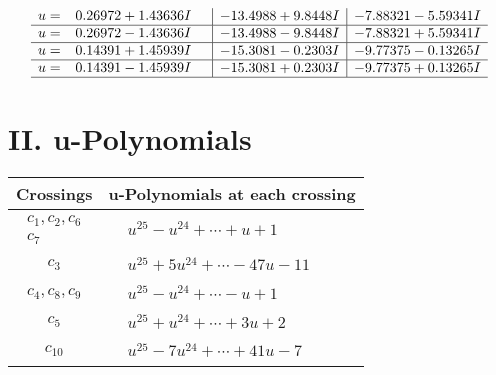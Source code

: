 \documentclass[1p]{elsarticle_modified}
\theoremstyle{definition}
\begin{document}
$$\begin{array}{c|c|c}
\begin{aligned}
u &= \phantom{-}0.26972 + 1.43636 I\end{aligned}
 & -13.4988 + 9.8448 I & -7.88321 - 5.59341 I \\ \hline\begin{aligned}
u &= \phantom{-}0.26972 - 1.43636 I\end{aligned}
 & -13.4988 - 9.8448 I & -7.88321 + 5.59341 I \\ \hline\begin{aligned}
u &= \phantom{-}0.14391 + 1.45939 I\end{aligned}
 & -15.3081 - 0.2303 I & -9.77375 - 0.13265 I \\ \hline\begin{aligned}
u &= \phantom{-}0.14391 - 1.45939 I\end{aligned}
 & -15.3081 + 0.2303 I & -9.77375 + 0.13265 I\\
 \hline 
 \end{array}$$\newpage
\newpage\renewcommand{\arraystretch}{1}
\centering \section*{ II. u-Polynomials}
\begin{tabular}{m{50pt}|m{274pt}}
Crossings & \hspace{64pt}u-Polynomials at each crossing \\
\hline $$\begin{aligned}c_{1},c_{2},c_{6}\\c_{7}\end{aligned}$$&$\begin{aligned}
&u^{25}- u^{24}+\cdots+u+1
\end{aligned}$\\
\hline $$\begin{aligned}c_{3}\end{aligned}$$&$\begin{aligned}
&u^{25}+5 u^{24}+\cdots-47 u-11
\end{aligned}$\\
\hline $$\begin{aligned}c_{4},c_{8},c_{9}\end{aligned}$$&$\begin{aligned}
&u^{25}- u^{24}+\cdots- u+1
\end{aligned}$\\
\hline $$\begin{aligned}c_{5}\end{aligned}$$&$\begin{aligned}
&u^{25}+u^{24}+\cdots+3 u+2
\end{aligned}$\\
\hline $$\begin{aligned}c_{10}\end{aligned}$$&$\begin{aligned}
&u^{25}-7 u^{24}+\cdots+41 u-7
\end{aligned}$\\
\hline
\end{tabular}\newpage\renewcommand{\arraystretch}{1}
\end{document}
